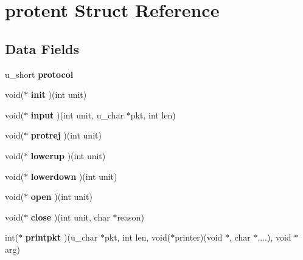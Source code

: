 \hypertarget{structprotent}{}\section{protent Struct Reference}
\label{structprotent}
\subsection*{Data Fields}
\begin{DoxyCompactItemize}
\item 
\mbox{\label{structprotent_a55840b9bcf4645e0d54b481274644a4a}} 
u\+\_\+short {\bfseries protocol}
\item 
\mbox{\label{structprotent_a296ece7290db6c2e3628f1f6039cdccd}} 
void($\ast$ {\bfseries init} )(int unit)
\item 
\mbox{\label{structprotent_a14b0c7f8af2dab73e92340722f314a2a}} 
void($\ast$ {\bfseries input} )(int unit, u\+\_\+char $\ast$pkt, int len)
\item 
\mbox{\label{structprotent_a807cebb1ab57baa8e2f9d03087697712}} 
void($\ast$ {\bfseries protrej} )(int unit)
\item 
\mbox{\label{structprotent_a1af01d636479bb43fdad90a626c15745}} 
void($\ast$ {\bfseries lowerup} )(int unit)
\item 
\mbox{\label{structprotent_a96534f5ada5f8aa28cb3436a2984d1a9}} 
void($\ast$ {\bfseries lowerdown} )(int unit)
\item 
\mbox{\label{structprotent_abb6df41e7344343800f62843efae00ab}} 
void($\ast$ {\bfseries open} )(int unit)
\item 
\mbox{\label{structprotent_a74e23d0addd3c12f8d37ea65f36dab54}} 
void($\ast$ {\bfseries close} )(int unit, char $\ast$reason)
\item 
\mbox{\label{structprotent_a2e97b9e11bf490ff3a5f0b505b019d71}} 
int($\ast$ {\bfseries printpkt} )(u\+\_\+char $\ast$pkt, int len, void($\ast$printer)(void $\ast$, char $\ast$,...), void $\ast$arg)
\item 

\end{DoxyCompactItemize}
